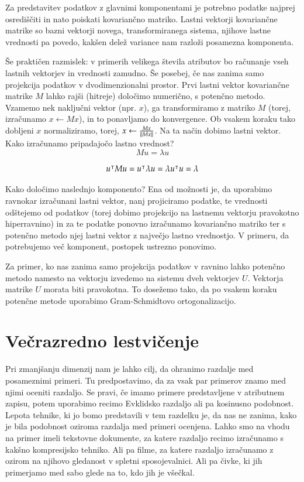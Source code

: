 Za predstavitev podatkov z glavnimi komponentami je potrebno podatke najprej osrediščiti in nato poiskati kovariančno matriko. Lastni vektorji kovariančne matrike so bazni vektorji novega, transformiranega sistema, njihove lastne vrednosti pa povedo, kakšen delež variance nam razloži posamezna komponenta.

Še praktičen razmislek: v primerih velikega števila atributov bo računanje vseh lastnih vektorjev in vrednosti zamudno. Še posebej, če nas zanima samo projekcija podatkov v dvodimenzionalni prostor. Prvi lastni vektor kovariančne matrike $M$ lahko rajši (hitreje) določimo numerično, s potenčno metodo. Vzamemo nek naključni vektor (npr. $x$), ga transformiramo z matriko $M$ (torej, izračunamo $x\leftarrow M x$), in to ponavljamo do konvergence. Ob vsakem koraku tako dobljeni $x$ normaliziramo, torej, $x\leftarrow \frac{M x}{\left\lVert M x\right\rVert}$. Na ta način dobimo lastni vektor. Kako izračunamo pripadajočo lastno vrednost?
\begin{equation}
  M u = \lambda u
\end{equation}

\begin{equation}
  u^\intercal M u = u^\intercal \lambda u = \lambda u^\intercal u = \lambda
\end{equation}

Kako določimo naslednjo komponento? Ena od možnosti je, da uporabimo ravnokar izračunani lastni vektor, nanj projiciramo podatke, te vrednosti odštejemo od podatkov (torej dobimo projekcijo na lastnemu vektorju pravokotno hiperravnino) in za te podatke ponovno izračunamo kovariančno matriko ter s potenčno metodo njej lastni vektor z največjo lastno vrednostjo. V primeru, da potrebujemo več komponent, postopek ustrezno ponovimo.

Za primer, ko nas zanima samo projekcija podatkov v ravnino lahko potenčno metodo namesto na vektorju izvedemo na sistemu dveh vektorjev $U$. Vektorja matrike $U$ morata biti pravokotna. To dosežemo tako, da po vsakem koraku potenčne metode uporabimo Gram-Schmidtovo ortogonalizacijo.

\section{Večrazredno lestvičenje}

Pri zmanjšanju dimenzij nam je lahko cilj, da ohranimo razdalje med posameznimi primeri. Tu predpostavimo, da za vsak par primerov znamo med njimi oceniti razdaljo. Se pravi, če imamo primere predstavljene v atributnem zapisu, potem uporabimo recimo Evklidsko razdaljo ali pa kosinusno podobnost. Lepota tehnike, ki jo bomo predstavili v tem razdelku je, da nas ne zanima, kako je bila podobnost oziroma razdalja med primeri ocenjena. Lahko smo na vhodu na primer imeli tekstovne dokumente, za katere razdaljo recimo izračunamo s kakšno kompresijsko tehniko. Ali pa filme, za katere razdaljo izračunamo z ozirom na njihovo gledanost v spletni sposojevalnici. Ali pa čivke, ki jih primerjamo med sabo glede na to, kdo jih je všečkal.

